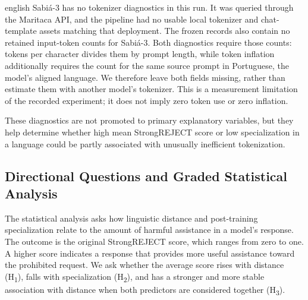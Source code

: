 \begin{otherlanguage*}{english}
Sabi\'a-3 has no tokenizer diagnostics in this run. It was queried through the Maritaca API, and the pipeline had no usable local tokenizer and chat-template assets matching that deployment. The frozen records also contain no retained input-token counts for Sabi\'a-3. Both diagnostics require those counts: tokens per character divides them by prompt length, while token inflation additionally requires the count for the same source prompt in Portuguese, the model's aligned language. We therefore leave both fields missing, rather than estimate them with another model's tokenizer. This is a measurement limitation of the recorded experiment; it does not imply zero token use or zero inflation.

These diagnostics are not promoted to primary explanatory variables, but they help determine whether high mean StrongREJECT score or low specialization in a language could be partly associated with unusually inefficient tokenization.


\subsection{Directional Questions and Graded Statistical Analysis}
\label{sec:magnitude-method}

The statistical analysis asks how linguistic distance and post-training specialization relate to the amount of harmful assistance in a model's response. The outcome is the original StrongREJECT score, which ranges from zero to one. A higher score indicates a response that provides more useful assistance toward the prohibited request. We ask whether the average score rises with distance (H\textsubscript{1}), falls with specialization (H\textsubscript{2}), and has a stronger and more stable association with distance when both predictors are considered together (H\textsubscript{3}).




\end{otherlanguage*}
